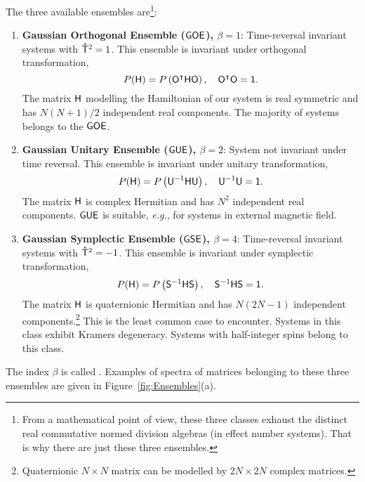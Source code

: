 \documentclass[a4paper,11pt,twoside]{article}
\begin{document}
    The three available ensembles are\footnote{
        From a mathematical point of view, these three classes exhaust the distinct real commutative normed division algebras (in effect number systems).
        That is why there are just these three ensembles.
    }: 
    \begin{enumerate}
        \item {\bf Gaussian Orthogonal Ensemble ($\mathsf{GOE}$), $\beta=1$}: 
            Time-reversal invariant systems with $\mathsf{\hat{T}}^{2}=1$.
            This ensemble is invariant under orthogonal transformation,
            \begin{equation}\label{eq:PHInvariance}
                P(\mathsf{H})=P\left({\mathsf{O}}^{\intercal}\mathsf{H}\mathsf{O}\right),
                \quad{\mathsf{O}}^{\intercal}\mathsf{O}=\mathsf{1}.
            \end{equation}
            The matrix $\mathsf{H}$ modelling the Hamiltonian of our system is real symmetric and has $N(N+1)/2$ independent real components.
            The majority of systems belongs to the $\mathsf{GOE}$.

        \item {\bf Gaussian Unitary Ensemble ($\mathsf{GUE}$), $\beta=2$}: 
            System not invariant under time reversal.
            This ensemble is invariant under unitary transformation,
            \begin{equation}
                P(\mathsf{H})=P\left(\mathsf{U}^{-1}\mathsf{H}\mathsf{U}\right),
                \quad\mathsf{U}^{-1}\mathsf{U}=\mathsf{1}.
            \end{equation}
            The matrix $\mathsf{H}$ is complex Hermitian and has $N^{2}$ independent real components.
            $\mathsf{GUE}$ is suitable, \emph{e.g.}, for systems in external magnetic field.
        
        \item {\bf Gaussian Symplectic Ensemble ($\mathsf{GSE}$), $\beta=4$}:
            Time-reversal invariant systems with $\mathsf{\hat{T}}^{2}=-1$.
            This ensemble is invariant under symplectic transformation,
            \begin{equation}
                P(\mathsf{H})=P\left(\mathsf{S}^{-1}\mathsf{H}\mathsf{S}\right),
                \quad\mathsf{S}^{-1}\mathsf{H}\mathsf{S}=\mathsf{1}.
            \end{equation}
            The matrix $\mathsf{H}$ is quaternionic Hermitian and has $N(2N-1)$ independent components.\footnote{Quaternionic $N\times N$ matrix can be modelled by $2N\times 2N$ complex matrices.}
            This is the least common case to encounter.
            Systems in this class exhibit Kramers degeneracy.
            Systems with half-integer spins belong to this class. 
    \end{enumerate} 
    The index $\beta$ is called .
    Examples of spectra of matrices belonging to these three ensembles are given in Figure~\ref{fig:Ensembles}(a). 
\end{document}

